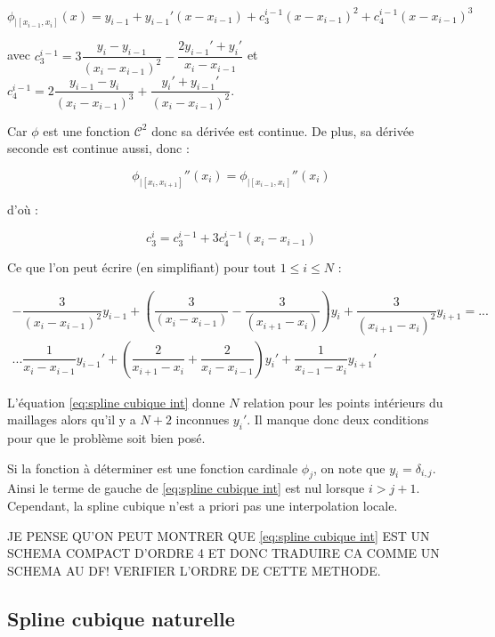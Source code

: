 \begin{equation}
\phi_{|[x_{i-1}, x_{i}]} (x) = y_{i-1} + y_{i-1}' (x-x_{i-1}) + c_3^{i-1} (x-x_{i-1})^2 + c_4^{i-1} (x-x_{i-1})^3
\end{equation}

avec $c_3^{i-1} = 3 \dfrac{y_i - y_{i-1}}{(x_{i}-x_{i-1})^2} - \dfrac{2 y_{i-1}' + y_{i}'}{x_{i}-x_{i-1}}$ et 
$c_4^{i-1} = 2 \dfrac{y_{i-1} - y_i}{(x_{i}-x_{i-1})^3} + \dfrac{y_{i}' + y_{i-1}'}{(x_{i}-x_{i-1})^2}$.

Car $\phi$ est une fonction $\mathcal{C}^2$ donc sa dérivée est continue. De plus, sa dérivée seconde est continue aussi, donc :

\begin{equation}
\phi_{|[x_i, x_{i+1}]}''(x_i) = \phi_{|[x_{i-1}, x_{i}]}''(x_i) 
\end{equation}

d'où :

\begin{equation}
c_3^i = c_3^{i-1} + 3 c_4^{i-1} ( x_i - x_{i-1} )
\end{equation}

Ce que l'on peut écrire (en simplifiant) pour tout $1 \leq i \leq N$ :

\begin{multline}
- \dfrac{3}{(x_i - x_{i-1})^2} y_{i-1} + \left( \dfrac{3}{(x_i - x_{i-1})} - \dfrac{3}{(x_{i+1} - x_{i})} \right) y_i + \dfrac{3}{(x_{i+1} - x_{i})^2} y_{i+1} = ...\\
... \dfrac{1}{x_i - x_{i-1}} y_{i-1}' + \left( \dfrac{2}{x_{i+1}-x_i} + \dfrac{2}{x_{i}-x_{i-1}} \right)y_i' + \dfrac{1}{x_{i-1} - x_{i}} y_{i+1}' 
\label{eq:spline cubique int}
\end{multline}

L'équation \eqref{eq:spline cubique int} donne $N$ relation pour les points intérieurs du maillages alors qu'il y a $N+2$ inconnues $y_i'$. Il manque donc deux conditions pour que le problème soit bien posé.

Si la fonction à déterminer est une fonction cardinale $\phi_j$, on note que $y_i = \delta_{i,j}$. Ainsi le terme de gauche de \eqref{eq:spline cubique int} est nul lorsque $i>j+1$. Cependant, la spline cubique n'est a priori pas une interpolation locale.

JE PENSE QU'ON PEUT MONTRER QUE \eqref{eq:spline cubique int} EST UN SCHEMA COMPACT D'ORDRE 4 ET DONC TRADUIRE CA COMME UN SCHEMA AU DF! VERIFIER L'ORDRE DE CETTE METHODE.

\subsection{Spline cubique naturelle}

